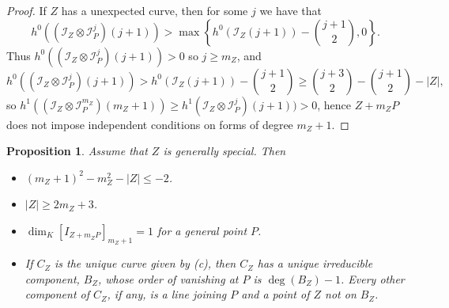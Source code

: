 \documentclass[12pt]{amsart}
\numberwithin{equation}{section}
\newtheorem{proposition}[theorem]{Proposition}
\theoremstyle{definition}
\begin{document}
\begin{proof}
If $Z$ has a unexpected curve, then for some $j$ we have that 
\[
h^0((\mathcal I_Z\otimes \mathcal I_P^j)(j+1))> \max \left \{ h^0(\mathcal I_Z(j+1)) - \binom{j+1}{2}, 0 \right \}.
\]
Thus $h^0((\mathcal I_Z\otimes \mathcal I_P^j)(j+1))>0$ so $j\geq m_Z$, 
and 
\[
h^0((\mathcal I_Z\otimes \mathcal I_P^j)(j+1))>h^0(\mathcal I_Z(j+1)) - \binom{j+1}{2}\geq \binom{j+3}{2}-\binom{j+1}{2}-|Z|,
\]
so $h^1((\mathcal I_Z\otimes \mathcal I_P^{m_Z})(m_Z+1))\geq h^1(\mathcal I_Z\otimes \mathcal I_P^j)(j+1))>0$,
hence $Z+m_ZP$ does not impose independent conditions on forms of degree $m_Z+1$.
\end{proof}

\begin{proposition}\label{uniqueUnexpCurveOfLeastDegree}
Assume that $Z$ is generally special. Then

\begin{itemize}
\item[(a)] $(m_Z+1)^2 - m_Z^2 - |Z| \leq -2$.

\item[(b)] $|Z| \geq 2m_Z+3$.

\item[(c)] $\dim_K [I_{Z+m_ZP}]_{m_Z+1} = 1$ for a general point $P$.

\item[(d)] If $C_Z$ is the unique curve given by (c), then $C_Z$ has a unique irreducible component, $B_Z$, whose order of vanishing at $P$ is $\deg (B_Z) - 1$. Every other component of $C_Z$, if any, is a line joining $P$ and a point of $Z$ not on $B_Z$.

\end{itemize}
\end{proposition}
\end{document}
